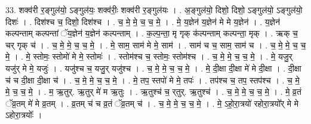 \documentclass[17pt]{extarticle}
\begin{document}
33. शक्व॑री र॒ङ्गुल॑यो॒ ऽङ्गुल॑यः॒ शक्व॑रीः॒ शक्व॑री र॒ङ्गुल॑यः । . अ॒ङ्गुल॑यो॒ दिशो॒ दिशो॒ ऽङ्गुल॑यो॒ ऽङ्गुल॑यो॒ दिशः॑ । . दिश॑श्च च॒ दिशो॒ दिश॑श्च । . च॒ मे॒ मे॒ च॒ च॒ मे॒ । . मे॒ य॒ज्ञेन॑ य॒ज्ञेन॑ मे मे य॒ज्ञेन॑ । . य॒ज्ञेन॑ कल्पन्ताम् कल्पन्तां ॅय॒ज्ञेन॑ य॒ज्ञेन॑ कल्पन्ताम् । . क॒ल्प॒न्ता॒ मृ गृक् क॑ल्पन्ताम् कल्पन्ता॒ मृक् । . ऋक् च॒ चर्‌ गृक् च॑ । . च॒ मे॒ मे॒ च॒ च॒ मे॒ । . मे॒ साम॒ साम॑ मे मे॒ साम॑ । . साम॑ च च॒ साम॒ साम॑ च । . च॒ मे॒ मे॒ च॒ च॒ मे॒ । . मे॒ स्तोमः॒ स्तोमो॑ मे मे॒ स्तोमः॑ । . स्तोम॑श्च च॒ स्तोमः॒ स्तोम॑श्च । . च॒ मे॒ मे॒ च॒ च॒ मे॒ । . मे॒ यजु॒र् यजु॑र् मे मे॒ यजुः॑ । . यजु॑श्च च॒ यजु॒र् यजु॑श्च । . च॒ मे॒ मे॒ च॒ च॒ मे॒ । . मे॒ दी॒क्षा दी॒क्षा मे॑ मे दी॒क्षा । . दी॒क्षा च॑ च दी॒क्षा दी॒क्षा च॑ । . च॒ मे॒ मे॒ च॒ च॒ मे॒ । . मे॒ तप॒ स्तपो॑ मे मे॒ तपः॑ । . तप॑श्च च॒ तप॒ स्तप॑श्च । . च॒ मे॒ मे॒ च॒ च॒ मे॒ । . म॒ ऋ॒तुर्. ऋ॒तुर् मे॑ म ऋ॒तुः । . ऋ॒तुश्च॑ च॒ र्‌तुर्. ऋ॒तुश्च॑ । . च॒ मे॒ मे॒ च॒ च॒ मे॒ । . मे॒ व्र॒तं ॅव्र॒तम् मे॑ मे व्र॒तम् । . व्र॒तम् च॑ च व्र॒तं ॅव्र॒तम् च॑ । . च॒ मे॒ मे॒ च॒ च॒ मे॒ । . मे॒ ऽहो॒रा॒त्रयो॑ रहोरा॒त्रयो᳚र् मे मे ऽहोरा॒त्रयोः᳚ । \newline
\end{document}
